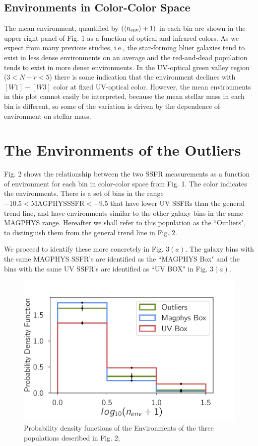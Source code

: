 \documentclass[iop]{emulateapj}
\begin{document}
\subsection{Environments in Color-Color Space}

The mean environment, quantified by $(\langle n_{\rm env}\rangle + 1)$
in each bin are shown in the upper right panel of Fig. $1$ as a function 
of optical and infrared colors. As we expect from many previous studies, 
i.e., the star-forming bluer galaxies tend to exist in less dense 
environments on an average and the red-and-dead population tends 
to exist in more dense environments. In the UV-optical green valley region
($3 < N-r < 5$) there is some indication that the environment declines 
with $[W1]-[W3]$ color at fixed UV-optical color. However, the 
mean environments in this plot cannot easily be interpreted, because
the mean stellar mass in each bin is different, so some of the variation
is driven by the dependence of environment on stellar mass.

\section{The Environments of the Outliers}

Fig. 2 shows the relationship between the two SSFR 
measurements as a function of environment
for each bin in color-color space from Fig. 1. The color
indicates the environments. 
There is a set of bins in the range 
$ -10.5 < \mathrm{MAGPHYS} \mathrm{SSFR} < -9.5$ that 
have lower UV SSFRs than the general trend line, and 
have environments similar to the other galaxy bins 
in the same MAGPHYS range. Hereafter we shall refer 
to this population as the ``Outliers", to distinguish 
them from the general trend line in Fig. $2$. 

We proceed to identify these more concretely in 
Fig. $3(a)$. The galaxy bins with the same MAGPHYS 
SSFR's are identified as the ``MAGPHYS Box" and 
the bins with the same UV SSFR's are identified as 
``UV BOX" in Fig. $3(a)$. \\

\begin{figure}
	\centering
		\includegraphics[width = 9 cm, height = 6.0 cm]{4_jk_plot.pdf}
	\caption{Probability density functions of the Environments of the three populations described in Fig. $2$; } 
\end{figure}
\end{document}
